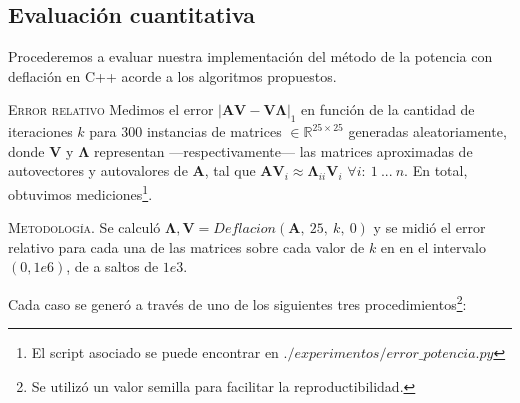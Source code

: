 \vspace{1em}


\vspace{1em}
\noindent {}






\vspace{2em}
\subsection{Evaluación cuantitativa} Procederemos a evaluar nuestra implementación del método de la potencia con deflación en C++ acorde a los algoritmos propuestos.

\vspace{1em}
\textsc{Error relativo} Medimos el error $|\mathbf{A} \mathbf{V} - \mathbf{V} \mathbf{\Lambda}|_1$ en función de la cantidad de iteraciones $k$ para 300 instancias de matrices $\in \mathbb{R}^{25 \times 25}$ generadas aleatoriamente, donde \textbf{V} y $\mathbf{\Lambda}$ representan ---respectivamente--- las matrices aproximadas de autovectores y autovalores de \textbf{A}, tal que $\mathbf{A}\mathbf{V}_i \approx \mathbf{\Lambda}_{ii} \mathbf{V}_i$ $\forall i:\ 1\ ...\ n$.  En total, obtuvimos  mediciones\footnote{El script asociado se puede encontrar en $./experimentos/error\_potencia.py$}.  


\vspace{1em}
\noindent \textsc{Metodología}. Se calculó  $\mathbf{\Lambda}, \mathbf{V} = Deflacion(\mathbf{A},\ 25,\ k,\ 0)$ y se midió el error relativo para cada una de las matrices sobre cada valor de $k$ en en el intervalo $(0, 1e6)$, de a saltos de $1e3$.

\vspace{1em}
\noindent Cada caso se generó a través de uno de los siguientes tres procedimientos\footnote{Se utilizó un valor semilla para facilitar la reproductibilidad.}:

